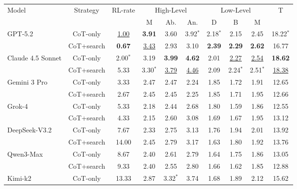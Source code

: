 \documentclass[letterpaper]{article} %
\begin{document}
\begin{table}[tb]
\centering

\setlength{\extrarowheight}{2pt}

\setlength{\aboverulesep}{1pt}
\setlength{\belowrulesep}{1pt}

\begin{tabular}{lccccccccc}
\toprule
\multirow{2}{*}{Model} & \multirow{2}{*}{Strategy} & \multirow{2}{*}{RL-rate} & \multicolumn{3}{c}{High-Level} & \multicolumn{3}{c}{Low-Level} & \multirow{2}{*}{T} \\
\cmidrule(lr){4-6}\cmidrule(lr){7-9}
& & & M & Ab. & An. & D & B & M & \\
\midrule
\multirow{2}{*}{GPT-5.2} & CoT-only  & \underline{1.00}  & \textbf{3.91} & 3.60 & 3.92$^*$ & 2.18$^*$ & 2.15 & 2.45 & 18.22$^*$ \\
\cline{2-10}
& CoT+search & \textbf{0.67} & \underline{3.43} & 2.93 & 3.10 & \textbf{2.39} & \textbf{2.29} & \textbf{2.62} & 16.77 \\
\midrule
\multirow{2}{*}{Claude 4.5 Sonnet} & CoT-only & 2.00$^*$ & 3.19 & \textbf{3.99} & \textbf{4.62} & 2.01 & \underline{2.27} & \underline{2.54} & \textbf{18.62}\\
\cline{2-10}
& CoT+search & 5.33 & 3.30$^*$ & \underline{3.79} & \underline{4.46} & 2.09 & 2.24$^*$ & 2.51$^*$ & \underline{18.38} \\
\midrule
\multirow{2}{*}{Gemini 3 Pro} & CoT-only & 3.33 & 2.47 & 2.47 & 2.24 & 1.85 & 1.72 & 1.91 & 12.65 \\
\cline{2-10}
& CoT+search & 2.67 & 2.45 & 2.45 & 2.25 & 1.85 & 1.71 & 1.95 & 12.66 \\
\midrule
\multirow{2}{*}{Grok-4} & CoT-only & 5.33 & 2.18 & 2.44 & 2.68 & 1.80 & 1.59 & 1.86 & 12.55 \\
\cline{2-10}
& CoT+search & 4.33 & 2.15 & 2.60 & 3.08 & 1.69 & 1.67 & 1.95 & 13.12 \\
\midrule
\multirow{2}{*}{DeepSeek-V3.2} & CoT-only & 7.67 & 2.33 & 2.75 & 3.13 & 1.76 & 1.94 & 2.01 & 13.92 \\
\cline{2-10}
& CoT+search & 14.00 & 2.45 & 2.79 & 3.17 & 1.63 & 1.80 & 1.92 & 13.76 \\
\midrule
\multirow{2}{*}{Qwen3-Max} & CoT-only & 8.67 & 2.40 & 2.61 & 2.79 & 1.64 & 1.75 & 1.86 & 13.05 \\
\cline{2-10}
& CoT+search & 9.33 & 2.40 & 2.55 & 2.80 & 1.66 & 1.62 & 1.85 & 12.88 \\
\midrule
\multirow{2}{*}{Kimi-k2} & CoT-only & 13.33 & 2.87 & 3.32$^*$ & 3.74 & 1.68 & 1.89 & 2.12 & 15.62 \\

\end{tabular}
\end{table}
\end{document}
